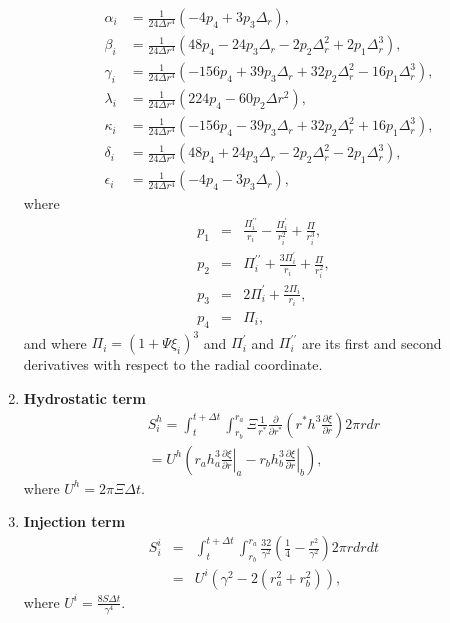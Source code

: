 \begin{enumerate}
\begin{eqnarray}
    &\alpha_{i}&=\frac{1}{24\Delta r^{4}}\left(-4p_4+3p_3\Delta_r \right)\nonumber ,\\
    &\beta_{i}&=\frac{1}{24\Delta r^{4}}\left(48p_4-24p_3\Delta_r-2p_2\Delta_r^2+2p_1\Delta_r^3\right) \nonumber,\\
    &\gamma_{i}&=\frac{1}{24\Delta r^{4}}\left(-156p_4+39p_3\Delta_r+32p_2\Delta_r^2-16p_1\Delta_r^3\right)\nonumber,\\
    &\lambda_{i}&=\frac{1}{24\Delta r^{4}}\left(224p_4-60p_2\Delta r^{2}\right) \nonumber,\\
    &\kappa_{i}&=\frac{1}{24\Delta r^{4}}\left( -156p_4-39p_3\Delta_r+32p_2\Delta_r^2+16p_1\Delta_r^3\right)\nonumber,\\
    &\delta_{i}&=\frac{1}{24\Delta r^{4}}\left( 48p_4+24p_3\Delta_r-2p_2\Delta_r^2-2p_1\Delta_r^3\right) \nonumber,\\
    &\epsilon_{i}&=\frac{1}{24\Delta r^{4}}\left(-4p_4-3p_3\Delta_r \right)\nonumber,
  \end{eqnarray}
  where
  \begin{eqnarray}
    p_1&=&\frac{ \Pi^{\prime\prime}_{i}}{r_i}-\frac{\Pi^{\prime}_{i}}{r_i^2} +\frac{\Pi}{r_i^3}\nonumber,\\
    p_2&=&\Pi^{\prime\prime}_{i}+\frac{3\Pi^{\prime}_{i}}{r_i} +\frac{\Pi}{r_i^2}\nonumber,\\
    p_3&=&2\Pi^{\prime}_{i}+\frac{2\Pi_i}{r_i}\nonumber,\\
    p_4&=&\Pi_i\nonumber,
  \end{eqnarray}
  and  where $  \Pi_{i}=(1+\Psi\xi_i)^{3}$ and  $\Pi^{\prime}_{i}$ and
  $ \Pi^{\prime\prime}_{i}$ are its  first and second derivatives with
  respect to the radial coordinate.
\item \textbf{Hydrostatic term}
  \begin{eqnarray}
    \label{C5-num4}
    S^{h}_{i}= \int_{t}^{t+\Delta t} \int_{r_b}^{r_a} \Xi \frac{1}{r^{*}} \frac{\partial}{\partial r^{*}}\left (r^{*}h^{3}\frac{\partial \xi}{\partial r}\right )2\pi r dr\\
    =U^{h}\left ( r_{a}h_{a}^{3} \left. \frac{\partial \xi}{\partial r}\right|_{a}-r_{b}h_{b}^{3}\left. \frac{\partial \xi}{\partial r}\right|_{b} \right )\nonumber,
  \end{eqnarray}
  where $U^{h}= 2 \pi \Xi \Delta t$.
\item \textbf{Injection term}
  \begin{eqnarray}
    \label{C5-num5}
    S^{i}_{i}&=&\int_{t}^{t+\Delta t} \int_{r_b}^{r_a} \frac{32}{\gamma^{2}} (\frac{1}{4}-\frac{r^{2}}{\gamma^{2}})  2 \pi r dr dt \\
             &=&U^{i}(\gamma^{2}-2(r_{a}^{2}+r_{b}^{2}))\nonumber,
  \end{eqnarray}
  where $U^{i}=\frac{8 S \Delta t}{\gamma^{4}}$.
 

\end{enumerate}
